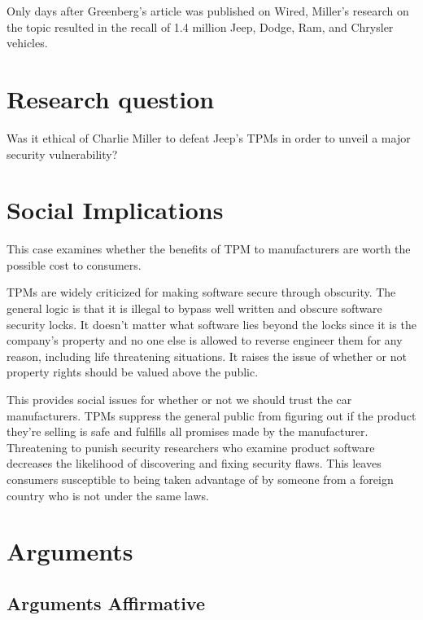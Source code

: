 \documentclass[12pt]{article}
\begin{document}
\begin{multicols}{2}
Only days after Greenberg's article was published on Wired, Miller's research on the topic resulted in the recall of 1.4 million Jeep, Dodge, Ram, and Chrysler vehicles.\cite{guardian} 


\section{Research question} 

Was it ethical of Charlie Miller to defeat Jeep's TPMs in order to unveil a major security vulnerability?

\section{Social Implications} 

This case examines whether the benefits of TPM to manufacturers are worth the possible cost to consumers.

TPMs are widely criticized for making software secure through obscurity.\cite{chris} The general logic is that it is illegal to bypass well written and obscure software security locks. It doesn't matter what software lies beyond the locks since it is the company's property and no one else is allowed to reverse engineer them for any reason, including life threatening situations.\cite{dictionary} It raises the issue of whether or not property rights should be valued above the public.\cite{turner}

This provides social issues for whether or not we should trust the car manufacturers. TPMs suppress the general public from figuring out if the product they're selling is safe and fulfills all promises made by the manufacturer. Threatening to punish security researchers who examine product software decreases the likelihood of discovering and fixing security flaws. This leaves consumers susceptible to being taken advantage of by someone from a foreign country who is not under the same laws.\cite{turner} 

\section{Arguments}

\subsection{Arguments Affirmative}


\end{multicols}
\end{document}
